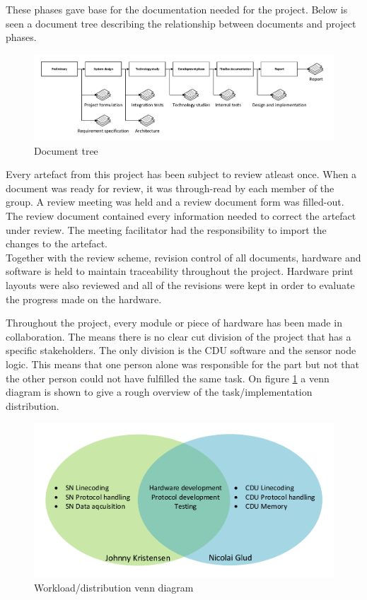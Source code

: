 These phases gave base for the documentation needed for the project. Below is seen a document tree describing the relationship between documents and project phases.

\begin{figure}[hbpt]
	\centering
	\includegraphics[width=.95\textwidth]{billeder/9projectexecution/documenttree}
	\caption{Document tree}
\end{figure}

Every artefact from this project has been subject to review atleast once. When a document was ready for review, it was through-read by each member of the group. A review meeting was held and a review document form was filled-out. The review document contained every information needed to correct the artefact under review. The meeting facilitator had the responsibility to import the changes to the artefact.\\
Together with the review scheme, revision control of all documents, hardware and software is held to maintain traceability throughout the project. 
Hardware print layouts were also reviewed and all of the revisions were kept in order to evaluate the progress made on the hardware.

Throughout the project, every module or piece of hardware has been made in collaboration. The means there is no clear cut division of the project that has a specific stakeholders. The only division is the CDU software and the sensor node logic. This means that one person alone was responsible for the part but not that the other person could not have fulfilled the same task. On figure \ref{fig:workvenn} a venn diagram is shown to give a rough overview of the task/implementation distribution.

\begin{figure}[hbpt]
	\centering
	\includegraphics[width=.8\textwidth]{billeder/9projectexecution/workload_venn}
	\caption{Workload/distribution venn diagram}
	\label{fig:workvenn}
\end{figure}



